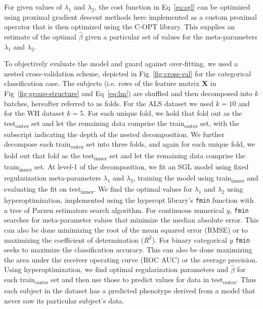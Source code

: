 For given values of $\lambda_1$ and $\lambda_2$, the cost function in Eq~\eqref{eq:sgl} can be optimized using proximal gradient descent methods
\cite{parikh2014proximal} here implemented as a custom proximal operator that is
then optimized using the C-OPT library\cite{copt}. This supplies an estimate of
the optimal $\hat{\beta}$ given a particular set of values for the
meta-parameters $\lambda_1$ and $\lambda_2$.

To objectively evaluate the model and guard against over-fitting,
we used a nested cross-validation scheme, depicted in
Fig~\ref{fig:cross-val} for the categorical classification case.
The subjects (i.e. rows of the feature matrix $\mathbf{X}$ in
Fig~\ref{fig:group-structure} and Eq~\eqref{eq:lm}) are shuffled and
then decomposed into $k$ batches, hereafter referred to as folds. For
the ALS dataset we used $k=10$ and for the WH dataset $k=5$. For each
unique fold, we hold that fold out as the test\textsubscript{outer} set
and let the remaining data comprise the train\textsubscript{outer} set,
with the subscript indicating the depth of the nested decomposition.
We further decompose each train\textsubscript{outer} set into three
folds, and again for each unique fold, we hold out that fold as the
test\textsubscript{inner} set and let the remaining data comprise the
train\textsubscript{inner} set. At level-1 of the decomposition, we fit
an SGL model using fixed regularization meta-parameters $\lambda_1$
and $\lambda_2$, training the model using train\textsubscript{inner}
and evaluating the fit on test\textsubscript{inner}. We find
the optimal values for $\lambda_1$ and $\lambda_2$ using
hyperoptimization, implemented using the hyperopt library's \verb|fmin|
function\cite{Bergstra_2015} with a tree of Parzen estimators search
algorithm\cite{bergstra2011algorithms}. For continuous numerical $y$,
\verb|fmin| searches for meta-parameter values that minimize the median
absolute error. This can also be done minimizing the root of the mean
squared error (RMSE) or to maximizing the coefficient of determination
($R^2$). For binary categorical $y$ \verb|fmin| seeks to maximize the
classification accuracy. This can also be done maximizing the area
under the receiver operating curve (ROC AUC) or the average precision.
Using hyperoptimization, we find optimal regularization parameters and
$\hat{\beta}$ for each train\textsubscript{outer} set and then use those
to predict values for data in test\textsubscript{outer}. Thus each
subject in the dataset has a predicted phenotype derived from a model
that never saw its particular subject's data.

